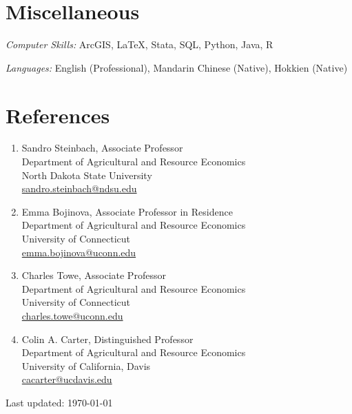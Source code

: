 \documentclass[10.5pt,letterpaper]{article}
\renewenvironment{itemize}{
	\begin{list}{}{
			\setlength{\leftmargin}{1.5em}
		}
	}{
	\end{list}
}
\begin{document}
	\section*{\textbf{Miscellaneous}}
	\begin{itemize}
		\item[-] \textit{Computer Skills:} ArcGIS, \LaTeX, Stata, SQL, Python, Java, R
		\item[-] \textit{Languages:} English (Professional), Mandarin Chinese (Native), Hokkien (Native)
	\end{itemize}
	
	\newpage
	\section*{\textbf{References}}
	\begin{enumerate}[leftmargin=0in]
		\item[] Sandro Steinbach, Associate Professor \\
		Department of Agricultural and Resource Economics \\
		North Dakota State University \\
		\href{mailto:sandro.steinbach@ndsu.edu}{sandro.steinbach@ndsu.edu}
		
		\item[] Emma Bojinova, Associate Professor in Residence \\
		Department of Agricultural and Resource Economics \\
		University of Connecticut \\
		\href{mailto:emma.bojinova@uconn.edu}{emma.bojinova@uconn.edu}
		
		\item[] Charles Towe, Associate Professor \\
		Department of Agricultural and Resource Economics \\
		University of Connecticut \\
		\href{mailto:charles.towe@uconn.edu}{charles.towe@uconn.edu}
		
		\item[] Colin A. Carter, Distinguished Professor \\
		Department of Agricultural and Resource Economics \\
		University of California, Davis \\
		\href{mailto:cacarter@ucdavis.edu}{cacarter@ucdavis.edu}
	\end{enumerate}
	
	\vfill
	\begin{center}
		\begin{footnotesize}
			\raggedleft Last updated: \today
		\end{footnotesize}
	\end{center}
	
\end{document}
